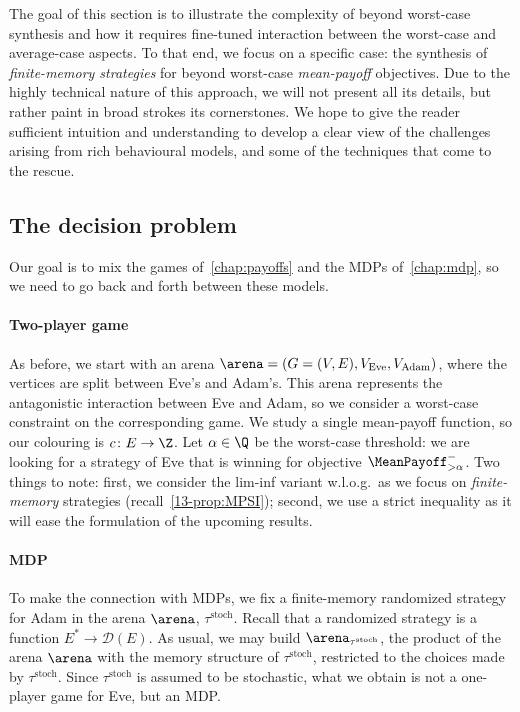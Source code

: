 The goal of this section is to illustrate the complexity of beyond worst-case synthesis and how it requires fine-tuned interaction between the worst-case and average-case aspects. To that end, we focus on a specific case: the synthesis of \textit{finite-memory strategies} for beyond worst-case \textit{mean-payoff} objectives. Due to the highly technical nature of this approach, we will not present all its details, but rather paint in broad strokes its cornerstones. We hope to give the reader sufficient intuition and understanding to develop a clear view of the challenges arising from rich behavioural models, and some of the techniques that come to the rescue. 

\subsection{The decision problem}

Our goal is to mix the games of~\cref{chap:payoffs} and the MDPs of~\cref{chap:mdp}, so we need to go back and forth between these models.

\paragraph{Two-player game} As before, we start with an arena $\arena = (G = (V, E), V_{\text{Eve}}, V_{\text{Adam}})$, where the vertices are split between Eve's and Adam's. This arena represents the antagonistic interaction between Eve and Adam, so we consider a worst-case constraint on the corresponding game. We study a single mean-payoff function, so our colouring is $c\colon E \to \Z$. Let $\alpha \in \Q$ be the worst-case threshold: we are looking for a strategy of Eve that is winning for objective $\MeanPayoff^{-}_{> \alpha}$. Two things to note: first, we consider the lim-inf variant w.l.o.g.~as we focus on \textit{finite-memory} strategies (recall~\cref{13-prop:MPSI}); second, we use a strict inequality as it will ease the formulation of the upcoming results.

\paragraph{MDP} To make the connection with MDPs, we fix a finite-memory randomized strategy for Adam in the arena $\arena$, $\tau^\text{stoch}$. Recall that a randomized strategy  is a function $E^* \to \mathcal{D}(E)$. As usual, we may build $\arena_{\tau^\text{stoch}}$, the product of the arena $\arena$ with the memory structure of $\tau^\text{stoch}$, restricted to the choices made by $\tau^\text{stoch}$. Since $\tau^\text{stoch}$ is assumed to be stochastic, what we obtain is not a one-player game for Eve, but an MDP.

